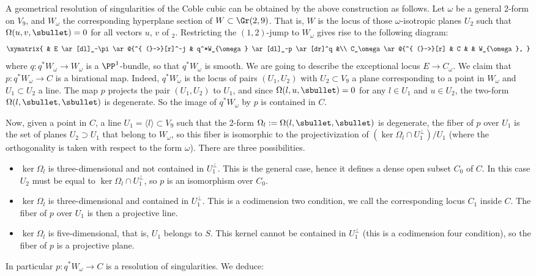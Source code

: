 A geometrical resolution of singularities of the Coble cubic can be obtained by the above construction
as follows. Let $\omega$ be a general 2-form on $V_9$, and $W_\omega$ the corresponding hyperplane section of
$W \subset \Gr(2,9)$. That is, $W$ is the locus of those $\omega$-isotropic planes $U_2$ such that
$\Omega(u,v,\sbullet)=0$ for all vectors $u$, $v$ of $_2$. Restricting the $(1,2)$-jump
to $W_\omega$ gives rise to the following diagram:
\begin{equation*}\label{eq:the-reso-of-coble}
\xymatrix{
& E \ar[dl]_-\pi \ar@{^{ (}->}[r]^-j & q^*W_{\omega} \ar[dl]_-p \ar[dr]^q &\\
C_\omega \ar@{^{ (}->}[r] & C & & W_{\omega},
}
\end{equation*}
where $q: q^*W_{\omega} \to W_{\omega}$ is a $\PP^1$-bundle, so that $q^*W_{\omega}$ is smooth. We are going
to describe the exceptional locus $E \to C_\omega$.
We claim that $p: q^* W_{\omega} \to C$ is a birational map. Indeed, $q^*W_{\omega}$ is the locus
of pairs $(U_1,U_2)$ with $U_2 \subset V_9$ a plane corresponding to a point in $W_{\omega}$ and
$U_1 \subset U_2$ a line. The map $p$ projects the
pair $(U_1,U_2)$ to $U_1$, and since $\Omega(l,u,\sbullet)=0$ for any $l\in U_1$ and $u\in U_2$, the two-form
$\Omega(l,\sbullet,\sbullet)$ is degenerate. So the image of $q^*W_{\omega}$ by $p$ is contained in $C$.

Now, given a point in $C$, \ie a line $U_1=\langle l\rangle\subset V_9$ such that the 2-form $\Omega_l:=\Omega(l,\sbullet,\sbullet)$
is degenerate, the fiber of $p$ over $U_1$ is the set of planes $U_2\supset U_1$ that belong to
$W_{\omega}$, so this fiber is isomorphic to the projectivization of $(\ker \Omega_l \cap U_1^\perp)/U_1$
(where the orthogonality is taken with respect to the form $\omega$).
There are three possibilities.
\begin{itemize}
\item $\ker \Omega_l$ is three-dimensional and not contained in $U_1^\perp$. This is the general case, hence it defines a dense open subset $C_0$ of $C$. In this case $U_2$ must be equal to
$\ker \Omega_l \cap U_1^\perp$, so $p$ is an isomorphism over $C_0$.
\item $\ker \Omega_l$ is three-dimensional and contained in $U_1^\perp$. This is a codimension two condition, we call the corresponding locus $C_1$
inside $C$. The fiber of $p$ over $U_1$ is then
a projective line.
\item $\ker \Omega_l$ is five-dimensional, that is, $U_1$ belongs to $S$. This kernel cannot
be contained in $U_1^\perp$ (this is a codimension four condition), so the fiber of $p$ is
a projective plane.
\end{itemize}
In particular $p : q^*W_\omega\to C$ is a resolution of singularities. We deduce:

